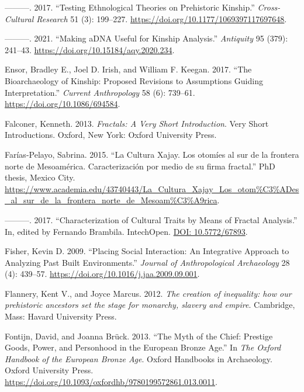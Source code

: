 \documentclass[
  12pt,
  a4paper, twoside]{book}
\newlength{\cslhangindent}
\newlength{\cslentryspacingunit} %
\newenvironment{CSLReferences}[2] %
 {%
  \setlength{\parindent}{0pt}
  \ifodd #1
  \let\oldpar\par
  \def\par{\hangindent=\cslhangindent\oldpar}
  \fi
  \setlength{\parskip}{#2\cslentryspacingunit}
 }%
 {}
\begin{document}
\begin{CSLReferences}{1}{0}
\leavevmode{}%
---------. 2017. {``Testing Ethnological Theories on Prehistoric Kinship.''} \emph{Cross-Cultural Research} 51 (3): 199--227. \url{https://doi.org/10.1177/1069397117697648}.

\leavevmode{}%
---------. 2021. {``Making aDNA Useful for Kinship Analysis.''} \emph{Antiquity} 95 (379): 241--43. \url{https://doi.org/10.15184/aqy.2020.234}.

\leavevmode{}%
Ensor, Bradley E., Joel D. Irish, and William F. Keegan. 2017. {``The Bioarchaeology of Kinship: Proposed Revisions to Assumptions Guiding Interpretation.''} \emph{Current Anthropology} 58 (6): 739--61. \url{https://doi.org/10.1086/694584}.

\leavevmode{}%
Falconer, Kenneth. 2013. \emph{Fractals: A Very Short Introduction}. Very Short Introductions. Oxford, New York: Oxford University Press.

\leavevmode{}%
Farías-Pelayo, Sabrina. 2015. {``La Cultura Xajay. Los otomíes al sur de la frontera norte de Mesoamérica. Caracterización por medio de su firma fractal.''} PhD thesis, Mexico City. \url{https://www.academia.edu/43740443/La_Cultura_Xajay_Los_otom\%C3\%ADes_al_sur_de_la_frontera_norte_de_Mesoam\%C3\%A9rica}.

\leavevmode{}%
---------. 2017. {``Characterization of Cultural Traits by Means of Fractal Analysis.''} In, edited by Fernando Brambila. IntechOpen. \href{https://DOI:\%2010.5772/67893}{DOI: 10.5772/67893}.

\leavevmode{}%
Fisher, Kevin D. 2009. {``Placing Social Interaction: An Integrative Approach to Analyzing Past Built Environments.''} \emph{Journal of Anthropological Archaeology} 28 (4): 439--57. \url{https://doi.org/10.1016/j.jaa.2009.09.001}.

\leavevmode{}%
Flannery, Kent V., and Joyce Marcus. 2012. \emph{The creation of inequality: how our prehistoric ancestors set the stage for monarchy, slavery and empire}. Cambridge, Mass: Havard University Press.

\leavevmode{}%
Fontijn, David, and Joanna Brück. 2013. {``The {Myth} of the {Chief}: {Prestige Goods}, {Power}, and {Personhood} in the {European Bronze Age}.''} In \emph{The {Oxford Handbook} of the {European Bronze Age}}. Oxford {Handbooks} in {Archaeology}. {Oxford University Press}. \url{https://doi.org/10.1093/oxfordhb/9780199572861.013.0011}.


\end{CSLReferences}
\end{document}
